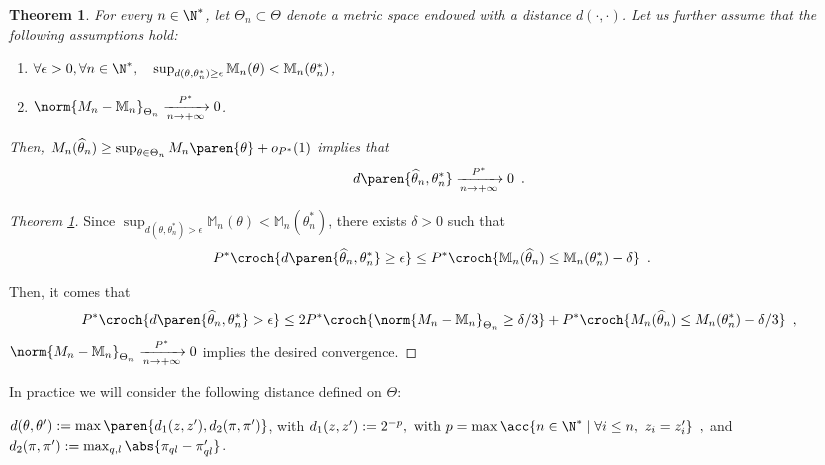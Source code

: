 \documentclass[11pt]{article}
\newtheorem{thm}{Theorem}[section]
\newtheorem{proof}{Proof}%
\renewcommand{\th}{\widehat{\theta}}
\newcommand{\thn}{\th_{n}}
\newcommand{\Mn}{\mathbb{M}_{n}}
\begin{document}
\bigskip

%
%


\begin{thm} \label{thm.conv.proba.theta.hat}
For every $n\in\N^*$, let $\Theta_n\subset\Theta$ denote a metric space endowed with a distance $d(\cdot,\cdot)$. Let us further assume that the following assumptions hold:
\begin{enumerate}
        \item $\forall \epsilon>0, \forall n\in\N^*,\quad \sup_{d(\theta,\theta_n^*) \ge \epsilon } \mathbb{M}_n(\theta)<\mathbb{M}_n(\theta_n^*)$,
        \item $\norm{M_n-\mathbb{M}_n}_{\Theta_n}\xrightarrow[n\to +\infty]{P^*}0$.
\end{enumerate}
Then, $M_n(\widehat{\theta}_n)\geq \sup_{\theta\in\Theta_n}M_n\paren{\theta}+o_{P^*}(1)$ implies that
\begin{align*}
        d\paren{\widehat{\theta}_n,\theta_n^*}\xrightarrow[n\to+\infty]{P^*}0\enspace.
\end{align*}
\end{thm}

\begin{proof}[Theorem \ref{thm.conv.proba.theta.hat}]
Since $\sup_{d(\theta,\theta_n^*)>\epsilon } \mathbb{M}_n(\theta)<\mathbb{M}_n(\theta_n^*)$, there exists $\delta>0$ such that
        \begin{align*}
        P^*\croch{d\paren{\thn,\theta^*_n}\geq \epsilon} & \leq
        P^*\croch{\Mn(\thn)\leq \Mn(\theta^*_n)-\delta}\enspace.
        \end{align*}

Then, it comes that
\begin{align*}
        P^*\croch{d\paren{\thn,\theta^*_n}>\epsilon}\leq 2P^*\croch{\norm{M_n-\mathbb{M}_n}_{\Theta_n}\geq \delta/3}+P^*\croch{M_n(\thn)\leq M_n(\theta^*_n)-\delta/3}\enspace,
\end{align*}
 $\norm{M_n-\mathbb{M}_n}_{\Theta_n}\xrightarrow[n\to +\infty]{P^*}0$  implies the desired convergence.
\end{proof}

In practice we will consider the following distance defined on $\Theta$:

$d(\theta,\theta'):=\max\paren{d_1(z,z'),d_2(\pi,\pi')}$, with
$d_1(z,z'):=2^{-p},\ \mathrm{with}\ p=\max\acc{n\in\N^*\mid \forall i\leq n,\ z_i=z'_i}\enspace,$ and
$d_2(\pi,\pi'):=\max_{q,l}\abs{\pi_{ql}-\pi'_{ql}}$.
\end{document}
